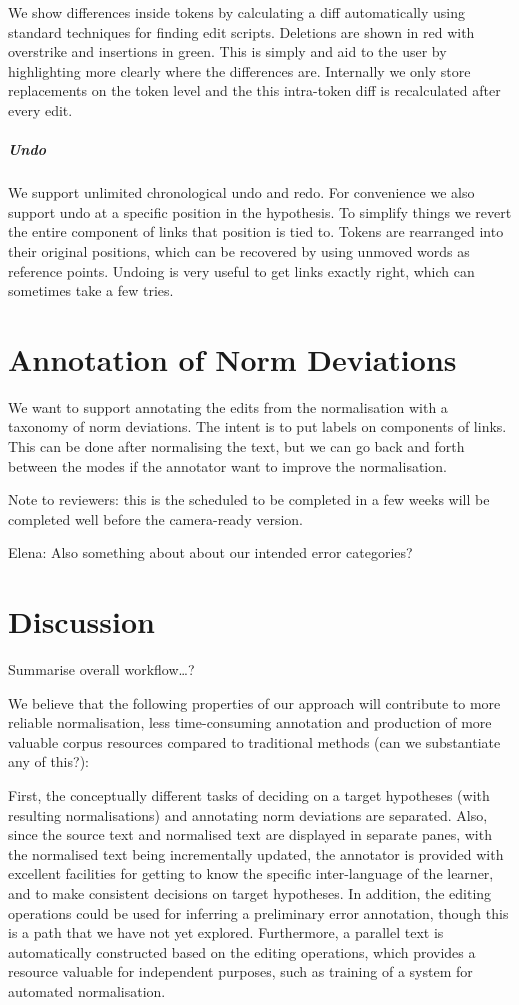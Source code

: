 \documentclass[10pt, a4paper]{article}
\begin{document}
We show differences inside tokens by calculating a diff automatically
using standard techniques for finding edit scripts.
Deletions are shown in red with overstrike and insertions in green.
This is simply and aid to the user by highlighting more clearly where the
differences are.  Internally we only store replacements on the token level
and the this intra-token diff is recalculated after every edit.

\subparagraph{Undo} We support unlimited chronological undo and redo.
For convenience we also support undo at a specific position in the hypothesis.
To simplify things we revert the entire component of links that position
is tied to. Tokens are rearranged into their original positions, which
can be recovered by using unmoved words as reference points.
Undoing is very useful to get links exactly right, which can sometimes take a
few tries.

\section{Annotation of Norm Deviations}

%
We want to support annotating the edits from the normalisation with a taxonomy
of norm deviations.  The intent is to put labels on components of links.
This can be done after normalising the text, but we can go back and forth
between the modes if the annotator want to improve the normalisation.

Note to reviewers: this is the scheduled to be completed in a few weeks
will be completed well before the camera-ready version.
%

Elena: Also something about about our intended error categories?

\section{Discussion}

Summarise overall workflow\ldots ?

We believe that the following properties of our approach will contribute to more reliable normalisation, less time-consuming annotation and production of more valuable corpus resources compared to traditional methods (can we substantiate any of this?):

First, the conceptually different tasks of deciding on a target hypotheses (with resulting normalisations) and annotating norm deviations are separated. Also, since the source text and normalised text are displayed in separate panes, with the normalised text being incrementally updated, the annotator is provided with excellent facilities for getting to know the specific inter-language of the learner, and to make consistent decisions on target hypotheses. In addition, the editing operations could be used for inferring a preliminary error annotation, though this is a path that we have not yet explored. Furthermore, a parallel text is automatically constructed based on the editing operations, which provides a resource valuable for independent purposes, such as training of a system for automated normalisation.
\end{document}
